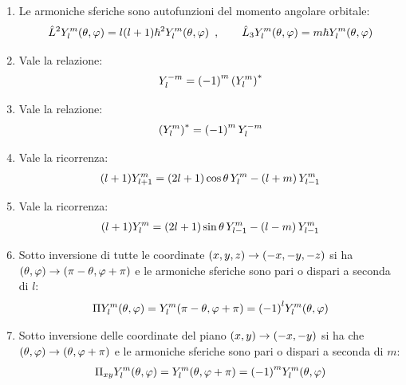 \begin{enumerate}
	\item Le armoniche sferiche sono autofunzioni del momento angolare orbitale:
	\begin{align*}
		& \hat{L}^2 Y_l^m\qty(\theta, \varphi) = l \qty(l + 1) \hbar^2 Y_l^m\qty(\theta, \varphi) \,\,\, , \qquad \hat{L}_3 Y_l^m\qty(\theta, \varphi) = m \hbar Y_l^m\qty(\theta, \varphi)  \\
	\end{align*}
	
	\item Vale la relazione:
	\begin{align*}
		Y_l^{-m} = \qty(-1)^m \, \qty(Y_l^{m} )^*
	\end{align*}
	
	\item Vale la relazione:
	\begin{align*}
		\qty(Y_l^{m})^* = \qty(-1)^m \,Y_l^{-m} 
	\end{align*}
	
	\item Vale la ricorrenza:
	\begin{align*}
		\qty(l+1) Y_{l+1}^m = \qty(2l + 1) \cos\theta \, Y_l^m - \qty(l + m) \, Y_{l-1}^m
	\end{align*}
	
	\item Vale la ricorrenza:
	\begin{align*}
		\qty(l+1) Y_{l}^m = \qty(2l + 1) \sin\theta \, Y_{l-1}^m - \qty(l - m) \, Y_{l-1}^m
	\end{align*}
	
	\item Sotto inversione di tutte le coordinate $\qty(x, y, z) \to \qty(-x, -y, -z) $ si ha $\qty(\theta, \varphi) \to \qty(\pi - \theta, \varphi + \pi)$ e le armoniche sferiche sono pari o dispari a seconda di $l$:
	\begin{align*}
		\Pi Y_l^m\qty(\theta, \varphi) = Y_l^m \qty(\pi - \theta, \varphi + \pi) = \qty(-1)^l Y_l^m \qty(\theta, \varphi)
	\end{align*}
	
	\item Sotto inversione delle coordinate del piano $\qty(x, y) \to \qty(-x, -y)$ si ha che $\qty(\theta, \varphi) \to \qty(\theta, \varphi + \pi)$ e le armoniche sferiche sono pari o dispari a seconda di $m$:
	\begin{align*}
		\Pi_{xy} Y_l^m\qty(\theta, \varphi) = Y_l^m \qty(\theta, \varphi + \pi) = \qty(-1)^m Y_l^m \qty(\theta, \varphi)
	\end{align*}


\end{enumerate}
